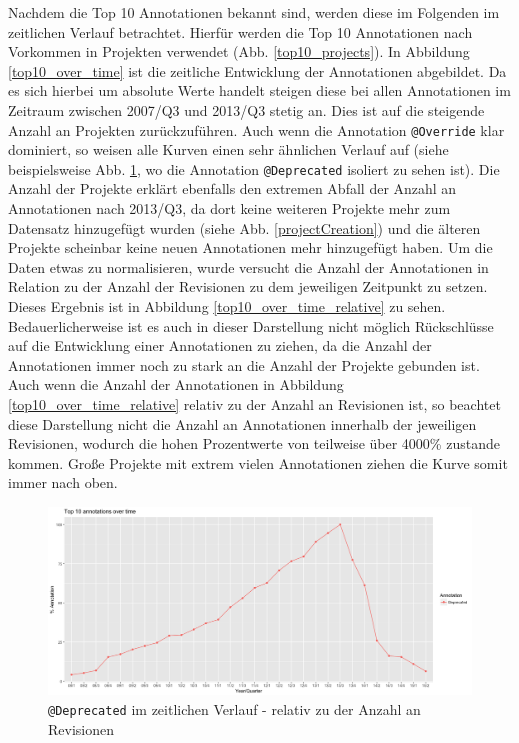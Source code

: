 \documentclass[11pt,a4paper,parskip=full]{scrartcl}
\begin{document}
Nachdem die Top 10 Annotationen bekannt sind, werden diese im Folgenden im zeitlichen Verlauf betrachtet. Hierfür werden die Top 10 Annotationen nach Vorkommen in Projekten verwendet (Abb. \ref{top10_projects}). In Abbildung \ref{top10_over_time} ist die zeitliche Entwicklung der Annotationen  abgebildet. Da es sich hierbei um absolute Werte handelt steigen diese bei allen Annotationen im Zeitraum zwischen 2007/Q3 und 2013/Q3 stetig an. Dies ist auf die steigende Anzahl an Projekten zurückzuführen. Auch wenn die Annotation \texttt{@Override} klar dominiert, so weisen alle Kurven einen sehr ähnlichen Verlauf auf (siehe beispielsweise Abb. \ref{deprecated}, wo die Annotation \texttt{@Deprecated} isoliert zu sehen ist). Die Anzahl der Projekte erklärt ebenfalls den extremen Abfall der Anzahl an Annotationen nach 2013/Q3, da dort keine weiteren Projekte mehr zum Datensatz hinzugefügt wurden (siehe Abb. \ref{projectCreation}) und die älteren Projekte scheinbar keine neuen Annotationen mehr hinzugefügt haben. Um die Daten etwas zu normalisieren, wurde versucht die Anzahl der Annotationen in Relation zu der Anzahl der Revisionen zu dem jeweiligen Zeitpunkt zu setzen. Dieses Ergebnis ist in Abbildung \ref{top10_over_time_relative} zu sehen. Bedauerlicherweise ist es auch in dieser Darstellung nicht möglich Rückschlüsse auf die Entwicklung einer Annotationen zu ziehen, da die Anzahl der Annotationen immer noch zu stark an die Anzahl der Projekte gebunden ist. Auch wenn die Anzahl der Annotationen in Abbildung \ref{top10_over_time_relative} relativ zu der Anzahl an Revisionen ist, so beachtet diese Darstellung nicht die Anzahl an Annotationen innerhalb der jeweiligen Revisionen, wodurch die hohen Prozentwerte von teilweise über 4000\% zustande kommen. Große Projekte mit extrem vielen Annotationen ziehen die Kurve somit immer nach oben.\par

\begin{figure}
	\centering
	\includegraphics[width=\textwidth]{plots/deprecated.png}
	\caption{\texttt{@Deprecated} im zeitlichen Verlauf - relativ zu der Anzahl an Revisionen}
	\label{deprecated}
\end{figure}
\end{document}
